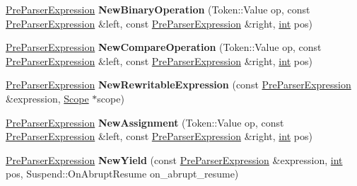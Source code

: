 \begin{DoxyCompactItemize}
\item 
\mbox{\label{classv8_1_1internal_1_1PreParserFactory_a1f7ab4f8a7dfea27792634bab54bb8c1}} 
\mbox{\hyperlink{classv8_1_1internal_1_1PreParserExpression}{Pre\+Parser\+Expression}} {\bfseries New\+Binary\+Operation} (Token\+::\+Value op, const \mbox{\hyperlink{classv8_1_1internal_1_1PreParserExpression}{Pre\+Parser\+Expression}} \&left, const \mbox{\hyperlink{classv8_1_1internal_1_1PreParserExpression}{Pre\+Parser\+Expression}} \&right, \mbox{\hyperlink{classint}{int}} pos)
\item 
\mbox{\label{classv8_1_1internal_1_1PreParserFactory_a87f0ee1e663988b1e911d1c7fed03887}} 
\mbox{\hyperlink{classv8_1_1internal_1_1PreParserExpression}{Pre\+Parser\+Expression}} {\bfseries New\+Compare\+Operation} (Token\+::\+Value op, const \mbox{\hyperlink{classv8_1_1internal_1_1PreParserExpression}{Pre\+Parser\+Expression}} \&left, const \mbox{\hyperlink{classv8_1_1internal_1_1PreParserExpression}{Pre\+Parser\+Expression}} \&right, \mbox{\hyperlink{classint}{int}} pos)
\item 
\mbox{\label{classv8_1_1internal_1_1PreParserFactory_a9e63212d7725ca92e15e59a2fbd91dca}} 
\mbox{\hyperlink{classv8_1_1internal_1_1PreParserExpression}{Pre\+Parser\+Expression}} {\bfseries New\+Rewritable\+Expression} (const \mbox{\hyperlink{classv8_1_1internal_1_1PreParserExpression}{Pre\+Parser\+Expression}} \&expression, \mbox{\hyperlink{classv8_1_1internal_1_1Scope}{Scope}} $\ast$scope)
\item 
\mbox{\label{classv8_1_1internal_1_1PreParserFactory_ad00170545ea46c03bbab9d0bc0160225}} 
\mbox{\hyperlink{classv8_1_1internal_1_1PreParserExpression}{Pre\+Parser\+Expression}} {\bfseries New\+Assignment} (Token\+::\+Value op, const \mbox{\hyperlink{classv8_1_1internal_1_1PreParserExpression}{Pre\+Parser\+Expression}} \&left, const \mbox{\hyperlink{classv8_1_1internal_1_1PreParserExpression}{Pre\+Parser\+Expression}} \&right, \mbox{\hyperlink{classint}{int}} pos)
\item 
\mbox{\label{classv8_1_1internal_1_1PreParserFactory_a50837240b7bdafc1e3f0c93d3ecb6360}} 
\mbox{\hyperlink{classv8_1_1internal_1_1PreParserExpression}{Pre\+Parser\+Expression}} {\bfseries New\+Yield} (const \mbox{\hyperlink{classv8_1_1internal_1_1PreParserExpression}{Pre\+Parser\+Expression}} \&expression, \mbox{\hyperlink{classint}{int}} pos, Suspend\+::\+On\+Abrupt\+Resume on\+\_\+abrupt\+\_\+resume)

\end{DoxyCompactItemize}
